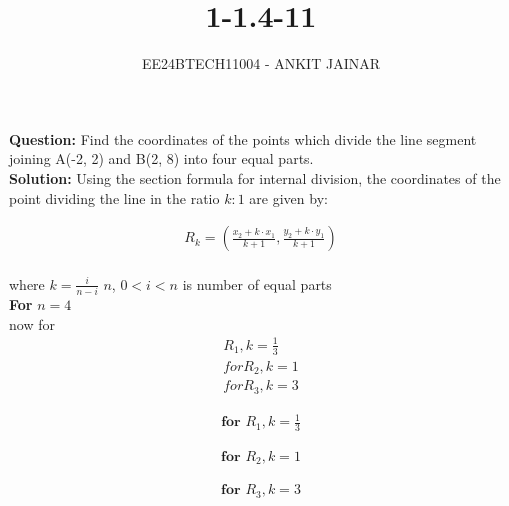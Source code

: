 \documentclass[journal]{IEEEtran}
\begin{document}

\vspace{3cm}


\title{1-1.4-11}
\author{EE24BTECH11004 - ANKIT JAINAR
}
{\let\newpage\relax\maketitle}

\renewcommand{\thefigure}{\theenumi}
\renewcommand{\thetable}{\theenumi}
\setlength{\intextsep}{10pt} %


\renewcommand{\thetable}{\theenumi}

\textbf{Question:} Find the coordinates of the points which divide the line segment joining A(-2, 2) and B(2, 8) into four equal parts.\\

\textbf{Solution:} Using the section formula for internal division, the coordinates of the point dividing the line in the ratio $k:1$ are given by:

\begin{align}
R_k = \left( \frac{x_2  + k \cdot x_1}{k+1}, \frac{ y_2 + k \cdot y_1}{k+1} \right)
\end{align} 
\\where $k = \frac{i}{n-i}$ $n$, $0<i<n$ is number of equal parts \\

\textbf{For} $n = 4$ \\


now for
\begin{align}
R_1,k=\frac{1}{3}\\
for R_2,k=1\\
for R_3,k=3
\end{align}

\begin{align}
\textbf{for $R_1$},k=\frac{1}{3}
\end{align}

\begin{align}	
\textbf{for $R_2$},k=1
\end{align}

\begin{align}
\textbf{for $R_3$},k=3
\end{align}
\end{document}
